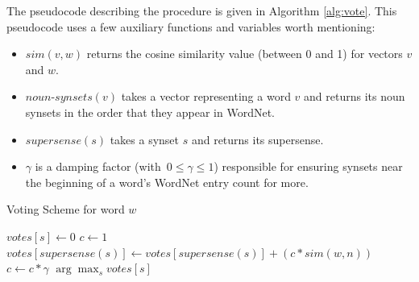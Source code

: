 \documentclass{article}
\begin{document}
\begin{enumerate}
The pseudocode describing the procedure is given in Algorithm \ref{alg:vote}.
This pseudocode uses a few auxiliary functions and variables worth mentioning:
\begin{itemize}
\item
$sim(v,w)$ returns the cosine similarity value (between 0 and 1) for vectors $v$ and $w$.
\item
$noun$-$synsets(v)$ takes a vector representing a word $v$ and returns its noun synsets in the order that they appear in WordNet.
\item
$supersense(s)$ takes a synset $s$ and returns its supersense.
\item
$\gamma$ is a damping factor (with~$0 \leq \gamma \leq 1$) responsible for ensuring synsets near the beginning of a word's WordNet entry count for more.
\end{itemize}
\begin{algorithm}[htbp]
\caption{Voting Scheme for word $w$}
\label{alg:vote}
\begin{algorithmic}
\STATE $votes[s] \gets 0$
\ENDFOR
{} 
\STATE $c \gets 1$
\STATE $votes[supersense(s)] \gets votes[supersense(s)] + (c * sim(w,n))$
\STATE $c \gets c * \gamma$
\ENDFOR
\ENDFOR
\RETURN $\arg\max_s votes[s]$
\end{algorithmic}
\end{algorithm}



%

\end{enumerate}
\end{document}

